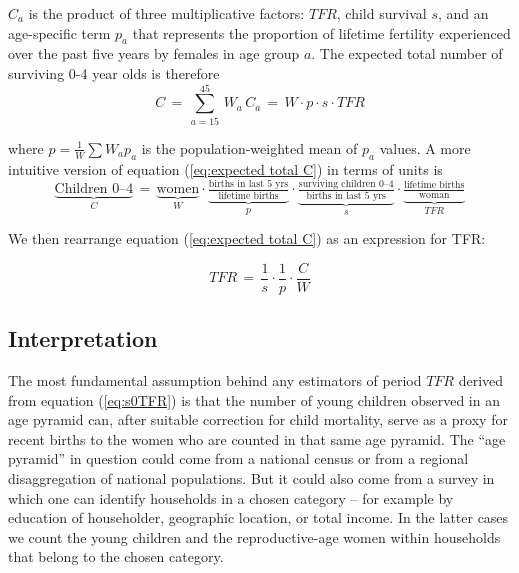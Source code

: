 \documentclass[12pt]{article}
\begin{document}
\(C_a\) is the product of three multiplicative factors: \(TFR\), child
survival \(s\), and an age-specific term \(p_a\) that represents the
proportion of lifetime fertility experienced over the past five years by
females in age group \(a\). The expected total number of surviving 0-4
year olds is therefore \begin{equation}
C\,=\,\sum_{a=15}^{45}\, W_{a}\, C_{a}\,=\, W \cdot p \cdot s \cdot TFR  \label{eq:expected total C}
\end{equation}

\noindent where \(p=\tfrac{1}{W}{\sum W_a p_a}\) is the
population-weighted mean of \(p_a\) values. A more intuitive version of
equation (\ref{eq:expected total C}) in terms of units is
\begin{equation*}
\underbrace{\text{Children 0--4}}_{C}\,=\, 
\underbrace{\text{women}}_{W}
\cdot 
\underbrace{\tfrac{\text{births in last 5 yrs}}{\text{lifetime births}}}_{p} 
\cdot 
\underbrace{\tfrac{\text{surviving children 0--4}}{\text{births in last 5 yrs}}}_{s}
\cdot 
\underbrace{\tfrac{\text{lifetime births}}{\text{woman}}}_{TFR}  
\label{eq:expected total C in words}
\end{equation*}

\noindent We then rearrange equation (\ref{eq:expected total C}) as an
expression for TFR:

\begin{equation}
TFR\,=\,\frac{1}{s}\cdot\frac{1}{p}\cdot\frac{C}{W}
\label{eq:s0TFR}
\end{equation}

\hypertarget{interpretation}{%
\subsection{Interpretation}\label{interpretation}}

The most fundamental assumption behind any estimators of period \(TFR\)
derived from equation (\ref{eq:s0TFR}) is that the number of young
children observed in an age pyramid can, after suitable correction for
child mortality, serve as a proxy for recent births to the women who are
counted in that same age pyramid. The ``age pyramid'' in question could
come from a national census or from a regional disaggregation of
national populations. But it could also come from a survey in which one
can identify households in a chosen category -- for example by education
of householder, geographic location, or total income. In the latter
cases we count the young children and the reproductive-age women within
households that belong to the chosen category.
\end{document}
